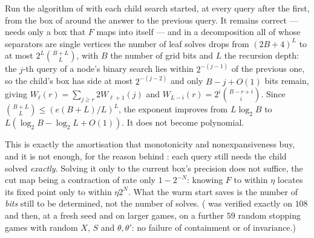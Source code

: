 \begin{proposition}\label{fsa:warm-count}
Run the algorithm of  with each child search started, at every
query after the first, from the box of  around the answer to
the previous query. It remains correct ---  needs only a box
that $F$ maps into itself --- and in a decomposition all of whose separators
are single vertices the number of leaf solves drops from $(2B+4)^{L}$ to at
most $2^{L}\binom{B+L}{L}$, with $B$ the number of grid bits and $L$ the
recursion depth: the $j$-th query of a node's binary search lies within
$2^{-(j-1)}$ of the previous one, so the child's box has side at most
$2^{-(j-2)}$ and only $B-j+O(1)$ bits remain, giving
$W_\ell(r)=\sum_{j\ge r}2W_{\ell+1}(j)$ and
$W_{L-i}(r)=2^{i}\binom{B-r+i}{i}$. Since
$\binom{B+L}{L}\le(e(B+L)/L)^{L}$, the exponent improves from $L\log_2B$ to
$L(\log_2B-\log_2L+O(1))$. It does not become polynomial.
\end{proposition}

\begin{remark}\label{fsa:warm-remark}
This is exactly the amortisation that monotonicity and nonexpansiveness buy,
and it is not enough, for the reason behind : each query
still needs the child solved \emph{exactly}. Solving it only to the current
box's precision does not suffice, the cut map being a contraction of rate only
$1-2^{-N}$: knowing $F$ to within $\eta$ locates its fixed point only to
within $\eta2^{N}$. What the warm start saves is the number of \emph{bits}
still to be determined, not the number of solves.
( was verified exactly on $108$ and then, at a fresh seed and
on larger games, on a further $59$ random stopping games with random $X$, $S$
and $\theta,\theta'$: no failure of containment or of invariance.)
\end{remark}